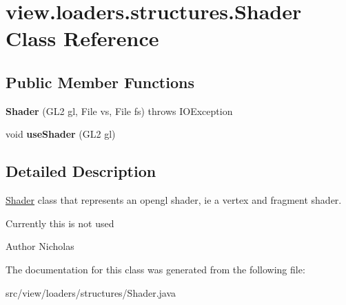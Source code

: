 \hypertarget{classview_1_1loaders_1_1structures_1_1_shader}{\section{view.\-loaders.\-structures.\-Shader Class Reference}
\label{classview_1_1loaders_1_1structures_1_1_shader}
}
\subsection*{Public Member Functions}
\begin{DoxyCompactItemize}
\item 
\hypertarget{classview_1_1loaders_1_1structures_1_1_shader_a9b3ac42119b7684612619a4a86dfab35}{{\bfseries Shader} (G\-L2 gl, File vs, File fs)  throws I\-O\-Exception }\label{classview_1_1loaders_1_1structures_1_1_shader_a9b3ac42119b7684612619a4a86dfab35}

\item 
\hypertarget{classview_1_1loaders_1_1structures_1_1_shader_ac44d55137349cf0b7a00446ecf3ff8f9}{void {\bfseries use\-Shader} (G\-L2 gl)}\label{classview_1_1loaders_1_1structures_1_1_shader_ac44d55137349cf0b7a00446ecf3ff8f9}

\end{DoxyCompactItemize}


\subsection{Detailed Description}
\hyperlink{classview_1_1loaders_1_1structures_1_1_shader}{Shader} class that represents an opengl shader, ie a vertex and fragment shader.

Currently this is not used

\begin{DoxyAuthor}{Author}
Nicholas 
\end{DoxyAuthor}


The documentation for this class was generated from the following file\-:\begin{DoxyCompactItemize}
\item 
src/view/loaders/structures/Shader.\-java\end{DoxyCompactItemize}
